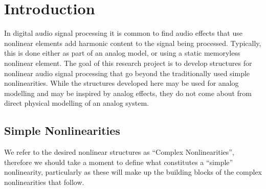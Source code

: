 \documentclass[twoside,a4paper]{article}
\title{\papertitle}
\affiliation{
\paperauthorA \,}
{\href{http://ccrma.stanford.edu}{Center for Computer Research in Music and Acoustics} \\ Stanford University \\ Palo Alto, CA \\ {\tt \href{mailto:jatin@ccrma.stanford.edu}{jatin@ccrma.stanford.edu}}}
\newif\ifpdf
\begin{document}
\ifpdf %
  \DeclareGraphicsExtensions{.png,.jpg,.pdf}
\else  %
\fi

\maketitle
%
\begin{abstract}
In this writing, we present an ongoing study of new and interesting
nonlinear structures for audio signal processing, with the intention
of use for audio effects and synthesis. We give a brief discussion of
each structure, and present a series of open-source audio plugins that
implement the structures.
\end{abstract}

\section{Introduction} \label{sec:intro}
%
In digital audio signal processing it is common to find audio effects
that use nonlinear elements add harmonic content to the signal being
processed. Typically, this is done either as part of an analog model,
or using a static memoryless nonlinear element.
\newline\newline
%
The goal of this research project is to develop structures for nonlinear
audio signal processing that go beyond the traditionally used simple
nonlinearities. While the structures developed here may be used for
analog modelling and may be inspired by analog effects, they do not
come about from direct physical modelling of an analog system.

\subsection{Simple Nonlinearities} \label{sec:simple}
%
We refer to the desired nonlinear structures as ``Complex
Nonlinearities'', therefore we should take a moment to define what
constitutes a ``simple'' nonlinearity, particularly as these will
make up the building blocks of the complex nonlinearities that follow.
\end{document}
